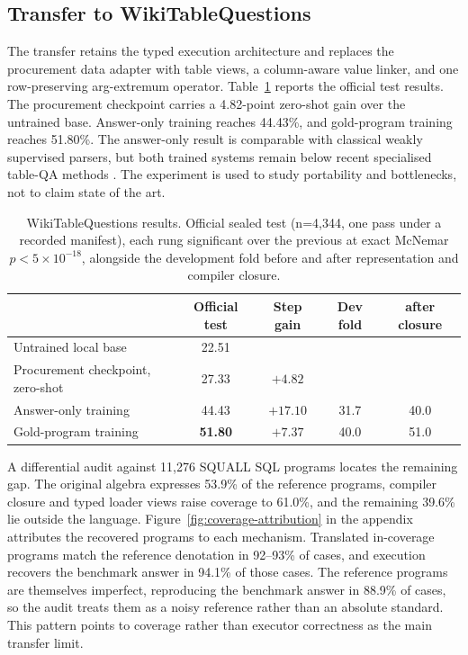 \documentclass{article}
\begin{document}
\subsection{Transfer to WikiTableQuestions}
\label{sec:wtq}

The transfer retains the typed execution architecture and replaces the
procurement data adapter with table views, a column-aware value linker, and one
row-preserving arg-extremum operator. Table~\ref{tab:wtq-results} reports the
official test results. The procurement checkpoint carries a 4.82-point
zero-shot gain over the untrained base. Answer-only training reaches 44.43\%,
and gold-program training reaches 51.80\%. The answer-only result is comparable
with classical weakly supervised parsers, but both trained systems remain below
recent specialised table-QA methods \citep{cheng2023binder,ye2023dater,
wang2024chainoftable}. The experiment is used to study portability and
bottlenecks, not to claim state of the art.

\begin{table}[t]
\centering
\caption{WikiTableQuestions results. Official sealed test (n=4{,}344,
one pass under a recorded manifest), each rung significant over the
previous at exact McNemar $p<5\times10^{-18}$, alongside the development
fold before and after representation and compiler closure.}
\label{tab:wtq-results}
\small
\begin{tabular}{lcccc}
\toprule
 & Official test & Step gain & Dev fold & after closure \\
\midrule
Untrained local base & 22.51 & & & \\
Procurement checkpoint, zero-shot & 27.33 & $+4.82$ & & \\
Answer-only training & 44.43 & $+17.10$ & 31.7 & 40.0 \\
Gold-program training & \textbf{51.80} & $+7.37$ & 40.0 & 51.0 \\
\bottomrule
\end{tabular}
\end{table}

A differential audit against 11{,}276 SQUALL SQL programs
\citep{shi2020squall} locates the remaining gap. The original algebra expresses
53.9\% of the reference programs, compiler closure and typed loader views
raise coverage to 61.0\%, and the remaining 39.6\% lie outside the
language. Figure~\ref{fig:coverage-attribution} in the appendix attributes
the recovered programs to each mechanism. Translated in-coverage programs
match the reference denotation in 92--93\% of cases, and execution recovers the
benchmark answer in 94.1\% of those cases. The reference programs are
themselves imperfect, reproducing the benchmark answer in 88.9\% of cases, so
the audit treats them as a noisy reference rather than an absolute standard.
This pattern points to coverage rather than executor correctness as the main
transfer limit.
\end{document}
